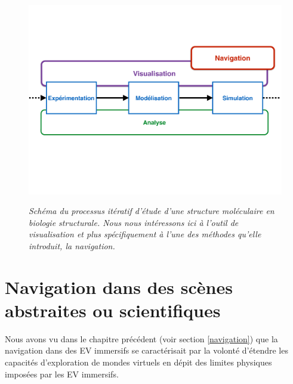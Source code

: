 



\begin{figure}
  \centering
  {\includegraphics[width=1.0\linewidth]{./figures/ch3/process_bio_struct_navigation}}
    \caption[Schéma du processus itératif d'étude d'une structure moléculaire en biologie structurale.]{\it Schéma du processus itératif d'étude d'une structure moléculaire en biologie structurale. Nous nous intéressons ici à l'outil de visualisation et plus spécifiquement à l'une des méthodes qu'elle introduit, la navigation.}
  \label{Fig:process_bio_struct_navigation}
  \hspace{0.3cm}
\end{figure}

\section{Navigation dans des scènes abstraites ou scientifiques}

Nous avons vu dans le chapitre précédent (voir section \ref{navigation}) que la navigation dans des EV immersifs se caractérisait par la volonté d'étendre les capacités d'exploration de mondes virtuels en dépit des limites physiques imposées par les EV immersifs.


